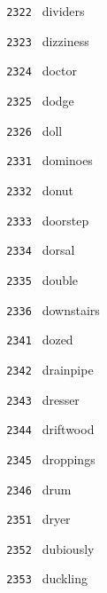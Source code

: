 \documentclass[11pt]{article}
\begin{document}
\begin{multicols}{6}
\noindent \texttt{ 2322 } \hspace{1mm} dividers  \par
\noindent \texttt{ 2323 } \hspace{1mm} dizziness  \par
\noindent \texttt{ 2324 } \hspace{1mm} doctor  \par
\noindent \texttt{ 2325 } \hspace{1mm} dodge  \par
\noindent \texttt{ 2326 } \hspace{1mm} doll  \par
\noindent \texttt{ 2331 } \hspace{1mm} dominoes  \par
\noindent \texttt{ 2332 } \hspace{1mm} donut  \par
\noindent \texttt{ 2333 } \hspace{1mm} doorstep  \par
\noindent \texttt{ 2334 } \hspace{1mm} dorsal  \par
\noindent \texttt{ 2335 } \hspace{1mm} double  \par
\noindent \texttt{ 2336 } \hspace{1mm} downstairs  \par
\noindent \texttt{ 2341 } \hspace{1mm} dozed  \par
\noindent \texttt{ 2342 } \hspace{1mm} drainpipe  \par
\noindent \texttt{ 2343 } \hspace{1mm} dresser  \par
\noindent \texttt{ 2344 } \hspace{1mm} driftwood  \par
\noindent \texttt{ 2345 } \hspace{1mm} droppings  \par
\noindent \texttt{ 2346 } \hspace{1mm} drum  \par
\noindent \texttt{ 2351 } \hspace{1mm} dryer  \par
\noindent \texttt{ 2352 } \hspace{1mm} dubiously  \par
\noindent \texttt{ 2353 } \hspace{1mm} duckling  \par

\end{multicols}
\end{document}

